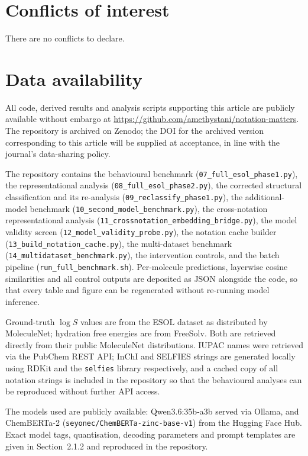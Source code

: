 \documentclass[twoside,twocolumn,9pt]{article}
\newcommand{\logS}{\ensuremath{\log S}}
\begin{document}
\section*{Conflicts of interest}

There are no conflicts to declare.

\section*{Data availability}

All code, derived results and analysis scripts supporting this article are publicly available without embargo at \url{https://github.com/amethystani/notation-matters}. The repository is archived on Zenodo; the DOI for the archived version corresponding to this article will be supplied at acceptance, in line with the journal's data-sharing policy.

The repository contains the behavioural benchmark (\texttt{07\_full\_esol\_phase1.py}), the representational analysis (\texttt{08\_full\_esol\_phase2.py}), the corrected structural classification and its re-analysis (\texttt{09\_reclassify\_phase1.py}), the additional-model benchmark (\texttt{10\_second\_model\_benchmark.py}), the cross-notation representational analysis (\texttt{11\_crossnotation\_embedding\_bridge.py}), the model validity screen (\texttt{12\_model\_validity\_probe.py}), the notation cache builder (\texttt{13\_build\_notation\_cache.py}), the multi-dataset benchmark (\texttt{14\_multidataset\_benchmark.py}), the intervention controls, and the batch pipeline (\texttt{run\_full\_benchmark.sh}). Per-molecule predictions, layerwise cosine similarities and all control outputs are deposited as JSON alongside the code, so that every table and figure can be regenerated without re-running model inference.

Ground-truth $\logS$ values are from the ESOL dataset\cite{delaney2004} as distributed by MoleculeNet;\cite{wu2018moleculenet} hydration free energies are from FreeSolv.\cite{mobley2014} Both are retrieved directly from their public MoleculeNet distributions. IUPAC names were retrieved via the PubChem REST API;\cite{kim2021} InChI and SELFIES strings are generated locally using RDKit\cite{landrum_rdkit} and the \texttt{selfies} library\cite{krenn2020} respectively, and a cached copy of all notation strings is included in the repository so that the behavioural analyses can be reproduced without further API access.

The models used are publicly available: Qwen3.6:35b-a3b\cite{qwen2025} served via Ollama, and ChemBERTa-2 (\texttt{seyonec/ChemBERTa-zinc-base-v1})\cite{ahmad2022} from the Hugging Face Hub. Exact model tags, quantisation, decoding parameters and prompt templates are given in Section~2.1.2 and reproduced in the repository.
\end{document}
